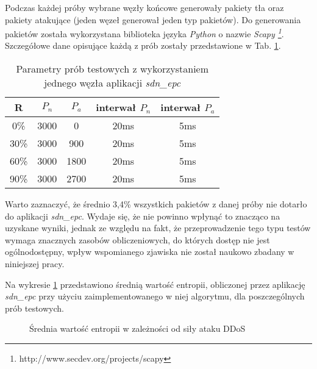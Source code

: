 Podczas każdej próby wybrane węzły końcowe generowały pakiety tła oraz
pakiety atakujące (jeden węzeł generował jeden typ pakietów). Do generowania
pakietów została wykorzystana biblioteka języka \textit{Python} o nazwie
\textit{ Scapy \footnote{http://www.secdev.org/projects/scapy}}. Szczegółowe
dane opisujące każdą z prób zostały przedstawione w Tab. \ref{tab:entropy}.

\begin{table}[h!]
\centering
\begin{tabular}{ |c|c|c|c|c| } 
 \hline
 R & $P_{n}$ & $P_{a}$ & interwał $P_{n}$ & interwał $P_{a}$ \\
 \hline
 0\% & 3000 & 0 & 20ms & 5ms \\ 
 \hline
 30\% & 3000 & 900 & 20ms & 5ms \\ 
 \hline
 60\% & 3000 & 1800 & 20ms & 5ms \\ 
 \hline
 90\% & 3000 & 2700 & 20ms & 5ms \\ 
 \hline
\end{tabular}
\caption{Parametry prób testowych z wykorzystaniem jednego węzła aplikacji
  \textit{sdn\_epc}} 
\label{tab:entropy}
\end{table}

Warto zaznaczyć, że średnio 3,4\% wszystkich pakietów z danej próby nie dotarło
do aplikacji \textit{sdn\_epc}. Wydaje się, że nie powinno wpłynąć to znacząco
na uzyskane wyniki, jednak ze względu na fakt, że przeprowadzenie tego typu
testów wymaga znacznych zasobów obliczeniowych, do których dostęp nie jest
ogólnodostępny, wpływ wspomianego zjawiska nie został naukowo zbadany w
niniejszej pracy.

Na wykresie \ref{plot:entropy} przedstawiono średnią wartość entropii,
obliczonej przez aplikację \textit{sdn\_epc} przy użyciu zaimplementowanego w
niej algorytmu, dla poszczególnych prób testowych.

\begin{figure}[h]
\centering
{}
\caption{Średnia wartość entropii w zależności od siły ataku DDoS}
\label{plot:entropy}
\end{figure}
\newpage

